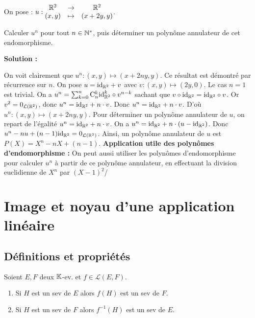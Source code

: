 \documentclass[12pt, a4paper]{report}
\begin{document}
\begin{exercise}
    On pose : $u : \begin{matrix}
    \mathbb{R}^2 &\to &\mathbb{R}^2\\
    (x,y) &\mapsto &(x+2y,y)
    \end{matrix}$.

    Calculer $u^n$ pour tout $n \in \mathbb{N}^*$, puis déterminer un polynôme annulateur de cet endomorphisme.

    \textbf{Solution :}

    \begin{outline}
        \1 On voit clairement que $u^n : (x,y) \mapsto (x + 2ny, y)$. Ce résultat est démontré par récurrence sur $n$.
        \1 On pose $u = \mathrm{id}_{\mathbb{R}^2} + v$ avec $v : (x,y) \mapsto (2y,0)$.
        \2 Le cas $n=1$ est trivial.
        \2 On a $u^n = \sum_{k=0}^{n}\mathrm{C}_{n}^{k} \mathrm{id}_{\mathbb{R}^2}^k \circ v^{n-k}$ sachant que $v\circ \mathrm{id}_{\mathbb{R}^2} = \mathrm{id}_{\mathbb{R}^2}\circ v$.
        \2 Or $v^2 = 0_{\mathcal L(\mathbb{R}^2)}$, donc $u^n = \mathrm{id}_{\mathbb{R}^2} + n\cdot v$.
        \2 Donc $u^n = \mathrm{id}_{\mathbb{R}^2} + n\cdot v$.
        \2 D'où $u^n : (x,y) \mapsto (x + 2ny, y)$.
        \1 Pour déterminer un polynôme annulateur de $u$, on repart de l'égalité $u^n = \mathrm{id}_{\mathbb{R}^2} + n\cdot v$.
        \2 On a $u^n = \mathrm{id}_{\mathbb{R}^2} + n\cdot (u - \mathrm{id}_{\mathbb{R}^2})$.
        \2 Donc $u^n -nu + (n-1)\mathrm{id}_{\mathbb{R}^2} = 0_{\mathcal L(\mathbb{R}^2)}$.
        \2 Ainsi, un polynôme annulateur de $u$ est $P(X) = X^n - nX + (n-1)$.
        \1 \textbf{Application utile des polynômes d'endomorphisme :} On peut aussi utiliser les polynômes d'endomorphisme pour calculer $u^n$ à partir de ce polynôme annulateur, en effectuant la division euclidienne de $X^n$ par $(X-1)^2$/
    \end{outline}

\end{exercise}

\chapter{Image et noyau d'une application linéaire}

\section{Définitions et propriétés}

\begin{property}
    Soient $E,F$ deux $\mathbb{K}$-ev. et $f \in \mathcal L(E,F)$.
    \begin{enumerate}
        \item Si $H$ est un sev de $E$ alors $f(H)$ est un sev de $F$.
        \item Si $H$ est un sev de $F$ alors $f^{-1}(H)$ est un sev de $E$.
    \end{enumerate}
\end{property}
\end{document}
